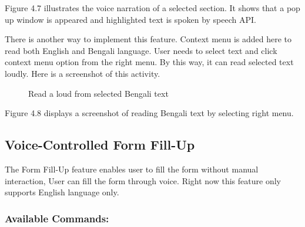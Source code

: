 Figure 4.7 illustrates the voice narration of a selected section. It shows that a pop up window is appeared and highlighted text is spoken by speech API.

There is another way to implement this feature. Context menu is added here to read both English and Bengali language. User needs to select text and click context menu option from the right menu. By this way, it can read selected text loudly. Here is a screenshot of this activity.

\begin{figure}[H] 
    \centering
    \caption{Read a loud from selected Bengali text}
    \label{fig:read_loud_selected_section}
\end{figure}

Figure 4.8 displays a screenshot of reading Bengali text by selecting right menu.

\subsection{Voice-Controlled Form Fill-Up}
The Form Fill-Up feature enables user to fill the form without manual interaction, User can fill the form through voice. Right now this feature only supports English language only.

\subsubsection*{Available Commands:}

